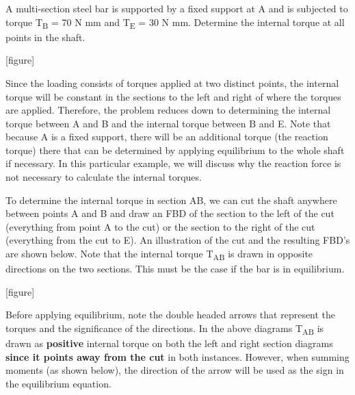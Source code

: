 \documentclass[
  letterpaper,
  DIV=11,
  numbers=noendperiod]{scrreprt}
\theoremstyle{definition}
\theoremstyle{remark}
\begin{document}
\begin{tcolorbox}[enhanced jigsaw, leftrule=.75mm, colbacktitle=quarto-callout-tip-color!10!white, breakable, opacityback=0, colback=white, titlerule=0mm, toprule=.15mm, colframe=quarto-callout-tip-color-frame, coltitle=black, title={Example 6.1}, toptitle=1mm, bottomrule=.15mm, rightrule=.15mm, left=2mm, arc=.35mm, opacitybacktitle=0.6, bottomtitle=1mm]

A multi-section steel bar is supported by a fixed support at A and is
subjected to torque T\textsubscript{B} = 70 N mm and T\textsubscript{E}
= 30 N mm. Determine the internal torque at all points in the shaft.

{[}figure{]}

\begin{tcolorbox}[enhanced jigsaw, leftrule=.75mm, colbacktitle=quarto-callout-tip-color!10!white, breakable, opacityback=0, colback=white, titlerule=0mm, toprule=.15mm, colframe=quarto-callout-tip-color-frame, coltitle=black, title={Solution}, toptitle=1mm, bottomrule=.15mm, rightrule=.15mm, left=2mm, arc=.35mm, opacitybacktitle=0.6, bottomtitle=1mm]

Since the loading consists of torques applied at two distinct points,
the internal torque will be constant in the sections to the left and
right of where the torques are applied. Therefore, the problem reduces
down to determining the internal torque between A and B and the internal
torque between B and E. Note that because A is a fixed support, there
will be an additional torque (the reaction torque) there that can be
determined by applying equilibrium to the whole shaft if necessary. In
this particular example, we will discuss why the reaction force is not
necessary to calculate the internal torques.~

To determine the internal torque in section AB, we can cut the shaft
anywhere between points A and B and draw an FBD of the section to the
left of the cut (everything from point A to the cut) or the section to
the right of the cut (everything from the cut to E). An illustration of
the cut and the resulting FBD's are shown below. Note that the internal
torque T\textsubscript{AB} is drawn in opposite directions on the two
sections. This must be the case if the bar is in equilibrium.

{[}figure{]}

Before applying equilibrium, note the double headed arrows that
represent the torques and the significance of the directions. In the
above diagrams T\textsubscript{AB} is drawn as \textbf{positive}
internal torque on both the left and right section diagrams
\textbf{since it points away from the cut} in both instances. However,
when summing moments (as shown below), the direction of the arrow will
be used as the sign in the equilibrium equation.


\end{tcolorbox}
\end{tcolorbox}
\end{document}
